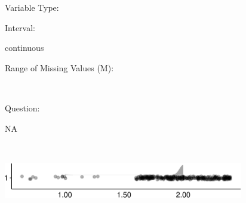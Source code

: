 \documentclass[
]{article}
\begin{document}
\begin{minipage}[t]{0.3\linewidth}

Variable Type:

\end{minipage}%
\begin{minipage}[t]{0.7\linewidth}

\end{minipage}

\begin{minipage}[t]{0.3\linewidth}

Interval:

\end{minipage}%
\begin{minipage}[t]{0.7\linewidth}

continuous

\end{minipage}

\begin{minipage}[t]{0.3\linewidth}

Range of Missing Values (M):

\end{minipage}%
\begin{minipage}[t]{0.7\linewidth}

~

\end{minipage}

\begin{minipage}[t]{0.3\linewidth}

Question:

\end{minipage}%
\begin{minipage}[t]{0.7\linewidth}

NA

\end{minipage}

\begin{minipage}[t]{0.3\linewidth}

~

\end{minipage}%
\begin{minipage}[t]{0.7\linewidth}

\includegraphics[width=396px]{codebook_template_files/figure-latex/help_pos_rainplot-1}

\end{minipage}
 \vspace*{-6mm} 
\end{document}
